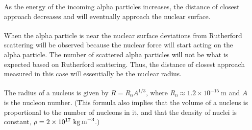 As the energy of the incoming alpha particles increases, the distance of closest approach decreases and will eventually approach the nuclear surface. \\\\
When the alpha particle is near the nuclear surface deviations from Rutherford scattering will be observed because the nuclear force will start acting on the alpha particle. The number of scattered alpha particles will not be what is expected based on Rutherford scattering. Thus, the distance of closest approach measured in this case will essentially be the nuclear radius.\\\\
The radius of a nucleus is given by $R=R_0 A^{1/3}$, where $R_0\approx 1.2\times 10^{-15}\ \text{m}$ and $A$ is the nucleon number. (This formula also implies that the volume of a nucleus is proportional to the number of nucleons in it, and that the density of nuclei is constant, $\rho=2\times 10^{17}\ \text{kg\,m}^{-3}$.)
